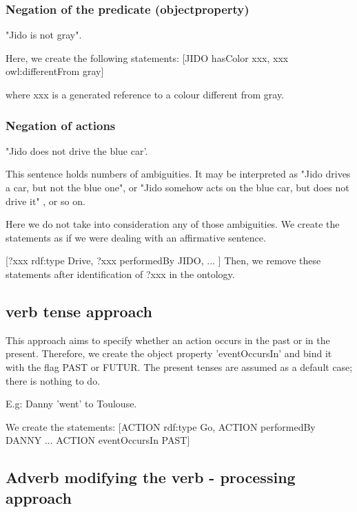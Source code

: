 \documentclass[twoside,a4paper,10pt]{report}
\newcommand{\dokutitleleveltree}[1]{\subsection{#1}}
\newcommand{\dokutitlelevelfour}[1]{\subsubsection{#1}}
\begin{document}
\dokutitlelevelfour{Negation of the predicate (object{\textunderscore}property)}

\small
\begin{verbatimtab}
  
  "Jido is not gray".
  
  Here, we create the following statements:
  [JIDO hasColor xxx,
  xxx owl:differentFrom gray]
  
  where xxx is a generated reference to a colour different from gray.
  
  
  
\end{verbatimtab}
\normalsize

\dokutitlelevelfour{Negation of actions}

\small
\begin{verbatimtab}
  
  "Jido does not drive the blue car'.
  
  This sentence holds numbers of ambiguities. It may be interpreted as "Jido drives  a car, but not
the blue one", or 
  "Jido somehow acts on the blue car, but does not drive it" , or so on.
  
  Here we do not take into consideration any of those ambiguities. We create the statements as if we
were dealing with an
  affirmative sentence.
  
  [?xxx rdf:type Drive,
  ?xxx performedBy JIDO,
  ...
  ]
  Then, we remove these statements after identification of ?xxx in the ontology.
  
\end{verbatimtab}
\normalsize


\dokutitleleveltree{verb tense approach}
\label{08641b0199dbb907cbef92fe4bff9f19}%
This approach aims to specify whether an action occurs in the past or in the present. Therefore, we create the object property 'eventOccursIn' and bind it with the flag PAST or FUTUR. The present tenses are assumed as a default case; there is nothing to do.


\small
\begin{verbatimtab}
  
  E.g: Danny 'went' to Toulouse.
  
  We create the statements:
  [ACTION rdf:type Go,
  ACTION performedBy DANNY
  ...
  ACTION eventOccursIn PAST]
  
  
\end{verbatimtab}
\normalsize

\dokutitleleveltree{Adverb modifying the verb - processing approach}
\label{6b19ff9faa8e1c3a849daa76f49f7353}%
 
\end{document}
